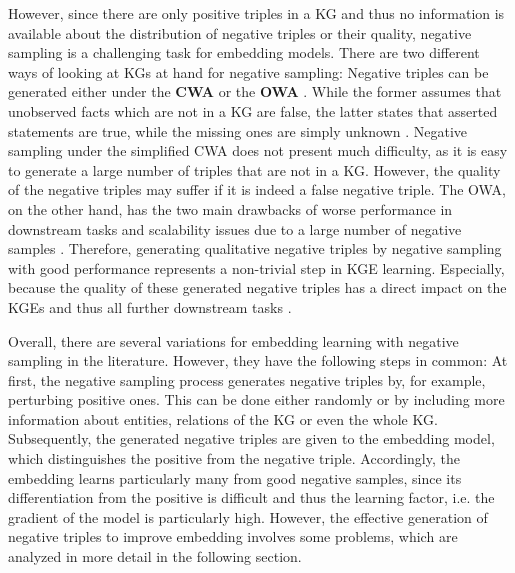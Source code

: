 However, since there are only positive triples in a \ac{KG} and thus no information is available about the distribution of negative triples or their quality, negative sampling is a challenging task for embedding models.
There are two different ways of looking at \acp{KG} at hand for negative sampling:
Negative triples can be generated either under the \textbf{\ac{CWA}} or the \textbf{\ac{OWA}} \cite{qiannegative}.
While the former assumes that unobserved facts which are not in a \ac{KG} are false, the latter states that asserted statements are true, while the missing ones are simply unknown \cite{arnaout2020enriching, qiannegative}.
Negative sampling under the simplified \ac{CWA} does not present much difficulty, as it is easy to generate a large number of triples that are not in a \ac{KG}.
However, the quality of the negative triples may suffer if it is indeed a false negative triple.
The \ac{OWA}, on the other hand, has the two main drawbacks of worse performance in downstream tasks and scalability issues due to a large number of negative samples \cite{qiannegative}.
Therefore, generating qualitative negative triples by negative sampling with good performance represents a non-trivial step in \ac{KGE} learning.
Especially, because the quality of these generated negative triples has a direct impact on the \acp{KGE} and thus all further downstream tasks \cite{qiannegative}.

Overall, there are several variations for embedding learning with negative sampling in the literature.
However, they have the following steps in common:
At first, the negative sampling process generates negative triples by, for example, perturbing positive ones.
This can be done either randomly or by including more information about entities, relations of the \ac{KG} or even the whole \ac{KG}.
Subsequently, the generated negative triples are given to the embedding model, which distinguishes the positive from the negative triple.
Accordingly, the embedding learns particularly many from good negative samples, since its differentiation from the positive is difficult and thus the learning factor, i.e. the gradient of the model is particularly high.
However, the effective generation of negative triples to improve embedding involves some problems, which are analyzed in more detail in the following section.




